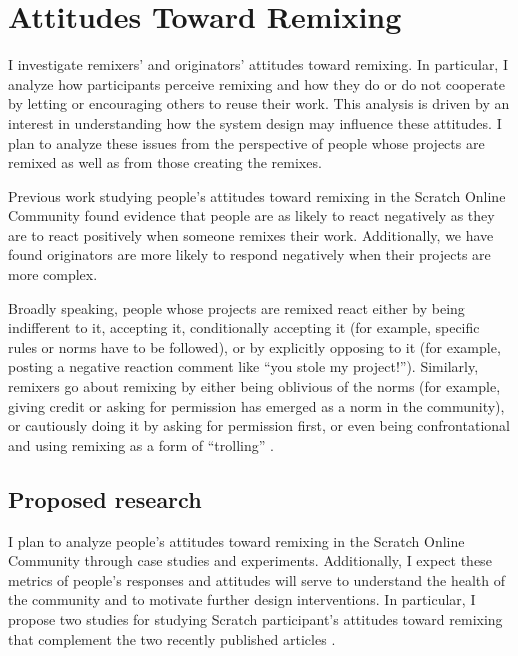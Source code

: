 \section{Attitudes Toward Remixing}

I investigate remixers' and originators' attitudes toward remixing. In particular, I analyze how participants perceive remixing and how they do or do not cooperate by letting or encouraging others to reuse their work.
This analysis is driven by an interest in understanding how the system design may influence these attitudes. 
I plan to analyze these issues from the perspective of people whose projects are remixed as well as from those creating the remixes.
 
Previous work studying people's attitudes toward remixing in the Scratch Online Community \citep{hill_responses_2010, monroy-hernandez_computers_2011} found evidence that people are as likely to react negatively as they are to react positively when someone remixes their work. 
Additionally, we have found originators are more likely to respond negatively when their projects are more complex.

Broadly speaking, people whose projects are remixed react either by being indifferent to it, accepting it, conditionally accepting it (for example, specific rules or norms have to be followed), or by explicitly opposing to it (for example, posting a negative reaction comment like ``you stole my project!'').
Similarly, remixers go about remixing by either being oblivious of the norms (for example, giving credit or asking for permission has emerged as a norm in the  community), or cautiously doing it by asking for permission first, or even being confrontational and using remixing as a form of ``trolling'' \cite{donath_identity_1998}.

\subsection{Proposed research}

I plan to analyze people's attitudes toward remixing in the Scratch Online Community through case studies and experiments.
Additionally, I expect these metrics of people's responses and attitudes will serve to understand the health of the community and to motivate further design interventions.
In particular, I propose two studies for studying Scratch participant's attitudes toward remixing that complement the two recently published articles \citep{hill_responses_2010, monroy-hernandez_computers_2011}.



